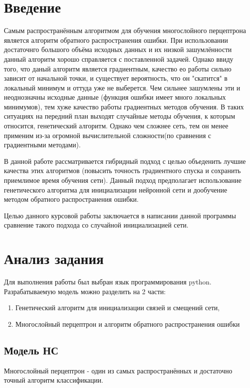 \documentclass[a4paper,12pt]{article}
\begin{document}
\newpage\section*{Введение}
Самым распространённым алгоритмом для обучения многослойного перцептрона является алгоритм обратного распространения ошибки. При использовании достаточнго большого объёма исходных данных и их низкой зашумлённости данный алгоритм хорошо справляется с поставленной задачей. Однако ввиду того, что даный алгоритм является градиентным, качество ео работы сильно зависит от начальной точки, и существует вероятность, что он "скатится" в локальный минимум и оттуда уже не выберется. Чем сильнее зашумлены эти и неоднозначны исходные данные (функция ошибки имеет много локальных минимумов), тем хуже качество работы градиентных методов обучения. В таких ситуациях на передний план выходят случайные методы обучения, к которым относится, генетический алгоритм. Однако чем сложнее сеть, тем он менее применим из-за огромной вычислительной сложности(по сравнения с градиентными методами). 
\par В данной работе рассматривается гибридный подход с целью объеденить лучшие качества этих алгоритмов (повысить точность градиентного спуска и сохранить приемлимое время обучения сети). Данный подход предполагает использование генетического алгоритма для инициализации нейронной сети и дообучение методом обратного распространения ошибки.
\par 

\par Целью данного курсовой работы заключается в написании данной программы сравнение такого подхода со случайной инициализацией сети.


\newpage\section{Анализ задания}
Для выполнения работы был выбран язык программирования python. Разрабатываемую модель можно разделить на 2 части: 
\begin{enumerate}
\item Генетический алгоритм для инициализации связей и смещений сети,
\item Многослойный перцептрон и алгоритм обратного распространения ошибки
\end{enumerate}

\subsection{Модель НС}
Многослойный перцептрон - один из самых распространённых и достаточно точный алгоритм классификации.
\end{document}

